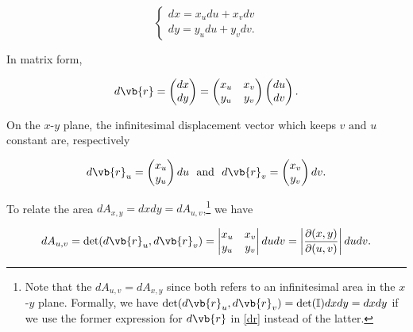 \documentclass[english,a4paper,12pt]{report}
\begin{document}
\begin{equation}
	\begin{cases}
		dx = x_{u} du + x_{v}  dv \\
		dy = y_{u} du + y_{v}  dv.  
	\end{cases}
\end{equation}

In matrix form,

\begin{equation}
	d\vb{r} =
	\begin{pmatrix}
		 dx \\
		 dy \\
	\end{pmatrix} = \begin{pmatrix}
		x_{u}   & x_{v}    \\
		y_{u}   & y_{v}    \\
	\end{pmatrix} \begin{pmatrix}
		 du \\
		 dv \\
	\end{pmatrix}.
\end{equation}

On the \(x\)-\(y\) plane, the infinitesimal displacement vector which keeps \(v \text { and } u\) constant are, respectively

\begin{equation} \label{dr} 
	d\vb{r} _{u} = \begin{pmatrix}
		 x_{u}  \\
		 y_{u}   \\
	\end{pmatrix}du  ~\text { and }~ d\vb{r} _{v} = \begin{pmatrix}
		 x_{v}  \\
		 y_{v}  \\
	\end{pmatrix}dv.
\end{equation}

To relate the area \(dA_{x,y} = dxdy = dA_{u,v}\),\footnote{Note that the \(dA_{u,v} = dA_{x,y} \) since both refers to an infinitesimal area in the \(x\)-\(y\) plane. Formally, we have \(\det (d\vb{r} _{u},d\vb{r} _{v}  ) = \det (\mathbb{I})dxdy = dxdy\) if we use the former expression for \(d\vb{r} \) in \cref{dr} instead of the latter.} we have 

\begin{equation}
	dA_{u,v} = \det  (d\vb{r} _{u},d\vb{r} _{v}  ) = \begin{vmatrix}
		x_{u}  & x_{v}   \\
		y_{u}  & y_{v}   \\
	\end{vmatrix} dudv = \left|\frac{\partial (x,y)}{\partial (u,v)}\right|dudv. 
\end{equation}
\end{document}
